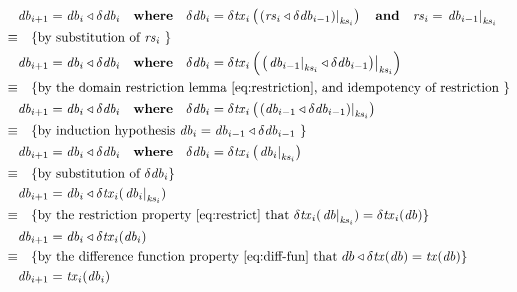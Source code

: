 \documentclass[11pt,a4paper]{article}
\newcommand\restrict[2]{\left.#1\right|_{#2}}
\begin{document}
\begin{align*}
       & \mathit{db}_{i+1} = \mathit{db}_i \triangleleft \delta\mathit{db}_i
         \quad \mathbf{where} \quad \delta\mathit{db}_i = \delta\mathit{tx}_i\left(\restrict{\left(\mathit{rs}_i \triangleleft \delta\mathit{db}_{i-1}\right)}{\mathit{ks}_i}\right)
         \quad \mathbf{and} \quad \mathit{rs}_i = \restrict{\mathit{db}_{i-1}}{\mathit{ks}_i}
      \\
\equiv & \quad \text{\{by substitution of $\mathit{rs}_i$ \}}
      \\
       & \mathit{db}_{i+1} = \mathit{db}_i \triangleleft \delta\mathit{db}_i
         \quad \mathbf{where} \quad \delta\mathit{db}_i = \delta\mathit{tx}_i\left(\restrict{\left(\restrict{\mathit{db}_{i-1}}{\mathit{ks}_i} \triangleleft \delta\mathit{db}_{i-1}\right)}{\mathit{ks}_i}\right)
      \\
\equiv & \quad \text{\{by the domain restriction lemma \cref{eq:restriction}, and idempotency of restriction \}}
      \\
       & \mathit{db}_{i+1} = \mathit{db}_i \triangleleft \delta\mathit{db}_i
         \quad \mathbf{where} \quad \delta\mathit{db}_i = \delta\mathit{tx}_i\left(\restrict{\left(\mathit{db}_{i-1} \triangleleft \delta\mathit{db}_{i-1}\right)}{\mathit{ks}_i}\right)
      \\
\equiv & \quad \text{\{by induction hypothesis $\mathit{db}_i = \mathit{db}_{i-1} \triangleleft \delta\mathit{db}_{i-1}$ \}}
      \\
       & \mathit{db}_{i+1} = \mathit{db}_i \triangleleft \delta\mathit{db}_i
         \quad \mathbf{where} \quad \delta\mathit{db}_i = \delta\mathit{tx}_i\left(\restrict{\mathit{db}_i}{\mathit{ks}_i}\right)
      \\
\equiv & \quad \text{\{by substitution of $\delta\mathit{db}_i$\}}
      \\
       & \mathit{db}_{i+1} = \mathit{db}_i \triangleleft \delta\mathit{tx}_i(\restrict{\mathit{db}_i}{\mathit{ks}_i})
      \\
\equiv & \quad \text{\{by the restriction property \cref{eq:restrict} that
                     $\delta\mathit{tx}_i(\restrict{\mathit{db}}{\mathit{ks}_i}) = \delta\mathit{tx}_i(\mathit{db})$\}}
      \\
       & \mathit{db}_{i+1} = \mathit{db}_i \triangleleft \delta\mathit{tx}_i(\mathit{db}_i)
      \\
\equiv & \quad \text{\{by the difference function property \cref{eq:diff-fun} that
                     $db \triangleleft \delta\mathit{tx}(\mathit{db}) = \mathit{tx}(\mathit{db})$\}}
      \\
       & \mathit{db}_{i+1} = \mathit{tx}_i(\mathit{db}_i)
\end{align*}
\end{document}
